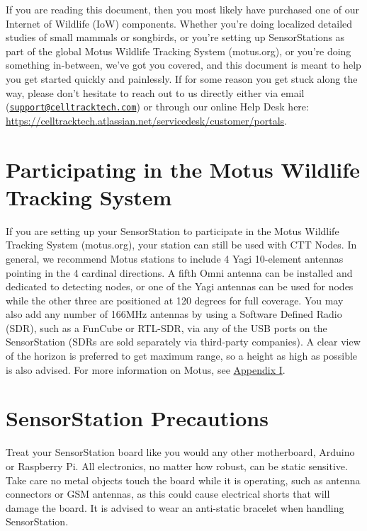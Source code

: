 \documentclass[
]{article}
\begin{document}
If you are reading this document, then you most likely have purchased
one of our Internet of Wildlife (IoW) components. Whether you're doing
localized detailed studies of small mammals or songbirds, or you're
setting up SensorStations as part of the global Motus Wildlife Tracking
System (motus.org), or you're doing something in-between, we've got you
covered, and this document is meant to help you get started quickly and
painlessly. If for some reason you get stuck along the way, please don't
hesitate to reach out to us directly either via email
(\href{mailto:support@celltracktech.com}{\nolinkurl{support@celltracktech.com}})
or through our online Help Desk here:
\url{https://celltracktech.atlassian.net/servicedesk/customer/portals}.

\hypertarget{participating-in-the-motus-wildlife-tracking-system}{%
\section{Participating in the Motus Wildlife Tracking
System}\label{participating-in-the-motus-wildlife-tracking-system}}

If you are setting up your SensorStation to participate in the Motus
Wildlife Tracking System (motus.org), your station can still be used
with CTT Nodes. In general, we recommend Motus stations to include 4
Yagi 10-element antennas pointing in the 4 cardinal directions. A fifth
Omni antenna can be installed and dedicated to detecting nodes, or one
of the Yagi antennas can be used for nodes while the other three are
positioned at 120 degrees for full coverage. You may also add any number
of 166MHz antennas by using a Software Defined Radio (SDR), such as a
FunCube or RTL-SDR, via any of the USB ports on the SensorStation (SDRs
are sold separately via third-party companies). A clear view of the
horizon is preferred to get maximum range, so a height as high as
possible is also advised. For more information on Motus, see
\protect\hyperlink{appendix_1}{Appendix I}.

\hypertarget{sensorstation-precautions}{%
\section{SensorStation Precautions}\label{sensorstation-precautions}}

Treat your SensorStation board like you would any other motherboard,
Arduino or Raspberry Pi. All electronics, no matter how robust, can be
static sensitive. Take care no metal objects touch the board while it is
operating, such as antenna connectors or GSM antennas, as this could
cause electrical shorts that will damage the board. It is advised to
wear an anti-static bracelet when handling SensorStation.
\end{document}
